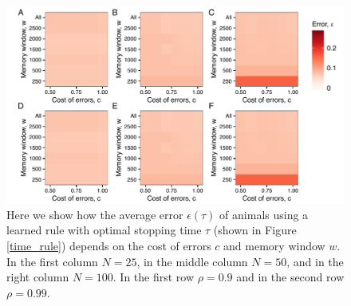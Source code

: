 \begin{figure}
\includegraphics[width=6.85in]{figures/error_heat_maps_rule.pdf}
\caption{\sffamily\small\textbf{} Here we show how the average error $\epsilon(\tau)$ of animals using a learned rule with optimal stopping time $\tau$ (shown in Figure \ref{time_rule}) depends on the cost of errors $c$ and memory window $w$. In the first column $N=25$, in the middle column $N=50$, and in the right column $N=100$. In the first  row $\rho=0.9$ and in the second row $\rho=0.99$.}
\label{error_rule}
\end{figure}



